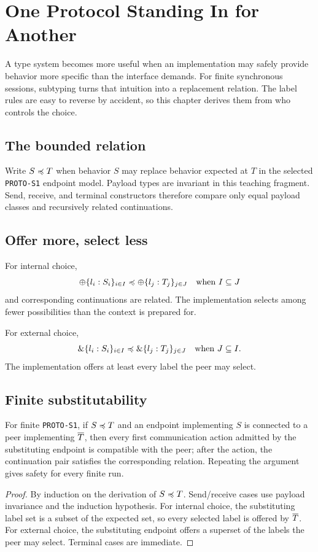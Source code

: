 \chapter{One Protocol Standing In for Another}

A type system becomes more useful when an implementation may safely provide behavior more specific than the interface demands. For finite synchronous sessions, subtyping turns that intuition into a replacement relation. The label rules are easy to reverse by accident, so this chapter derives them from who controls the choice.

\section{The bounded relation}
Write $S\preccurlyeq T$ when behavior $S$ may replace behavior expected at $T$ in the selected \texttt{PROTO-S1} endpoint model. Payload types are invariant in this teaching fragment. Send, receive, and terminal constructors therefore compare only equal payload classes and recursively related continuations.



\section{Offer more, select less}
For internal choice,
\[
\oplus\{l_i:S_i\}_{i\in I}\preccurlyeq
\oplus\{l_j:T_j\}_{j\in J}
\quad\text{when }I\subseteq J
\]
and corresponding continuations are related. The implementation selects among fewer possibilities than the context is prepared for.

For external choice,
\[
\mathbin{\&}\{l_i:S_i\}_{i\in I}\preccurlyeq
\mathbin{\&}\{l_j:T_j\}_{j\in J}
\quad\text{when }J\subseteq I.
\]
The implementation offers at least every label the peer may select.

\section{Finite substitutability}
\begin{theorem}
For finite \texttt{PROTO-S1}, if $S\preccurlyeq T$ and an endpoint implementing $S$ is connected to a peer implementing $\overline{T}$, then every first communication action admitted by the substituting endpoint is compatible with the peer; after the action, the continuation pair satisfies the corresponding relation. Repeating the argument gives safety for every finite run.
\end{theorem}
\begin{proof}
By induction on the derivation of $S\preccurlyeq T$. Send/receive cases use payload invariance and the induction hypothesis. For internal choice, the substituting label set is a subset of the expected set, so every selected label is offered by $\overline{T}$. For external choice, the substituting endpoint offers a superset of the labels the peer may select. Terminal cases are immediate.
\end{proof}

